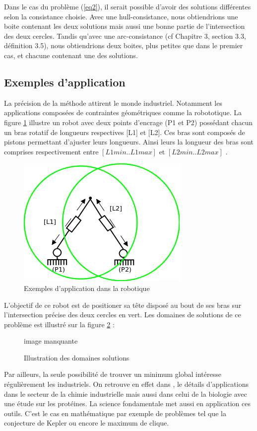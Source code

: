 Dans le cas du problème (\ref{eq2}), il serait possible d'avoir des solutions différentes selon la consistance choisie. Avec une hull-consistance, nous obtiendrions une boite contenant les deux solutions mais aussi une bonne partie de l'intersection des deux cercles. Tandis qu'avec une arc-consistance (cf \cite{Goualard} Chapitre 3, section 3.3, définition 3.5), nous obtiendrions deux boites, plus petites que dans le premier cas, et chacune contenant une des solutions.


\subsection{Exemples d'application}

La précision de la méthode attirent le monde industriel. Notamment les applications composées de contraintes géométriques comme la robototique. La figure \ref{fig:rob} illustre un robot avec deux points d'encrage (P1 et P2) possédant chacun un bras rotatif de longueurs respectives [L1] et [L2]. Ces bras sont composés de pistons permettant d'ajuster leurs longueurs. Ainsi leurs la longueur des bras sont comprises respectivement entre $[L1min .. L1max]$ et $[L2min .. L2max]$ . 

\begin{figure}[h] %
  \center
\includegraphics[scale=0.80]{img/robot2}
  \caption{Exemples d'application dans la robotique} %
 \label{fig:rob} %
\end{figure} %
L'objectif de ce robot est de positioner sa tête disposé au bout de ses bras sur l'intersection précise des deux cercles en vert.  Les domaines de solutions de ce problème est illustré sur la figure \ref{fig:rob2} : 

\begin{figure}[h] %
  \center
\huge image manquante
  \caption{Illustration des domaines solutions} %
 \label{fig:rob2} %
\end{figure} %
  Par ailleurs, la seule possibilité de trouver un minimum global intéresse régulièrement les industriels. On retrouve en effet dans \cite{Schichl}, le détails d'applications dans le secteur de la chimie industrielle mais aussi dans celui de la biologie avec une étude sur les protéines.
 La science fondamentale met aussi en application ces outils. C'est le cas en mathématique par exemple de problèmes tel que la conjecture de Kepler ou encore le  maximum de clique.
 \clearpage
